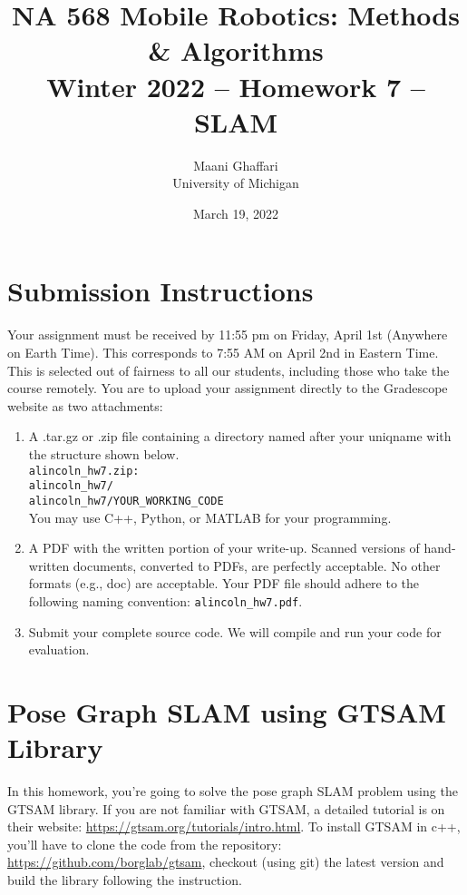 \documentclass{article}
\title{NA 568 Mobile Robotics: Methods \& Algorithms \\ Winter 2022 -- Homework 7 -- SLAM}
\author{Maani Ghaffari \\ University of Michigan}
\date{March 19, 2022}
\begin{document}
\maketitle

\section*{Submission Instructions}
Your assignment must be received by 11:55 pm on Friday, April 1st (Anywhere on Earth Time). This corresponds to 7:55 AM on April 2nd in Eastern Time. This is selected out of fairness to all our students, including those who take the course remotely. You are to upload your assignment directly to the Gradescope website as two attachments:

\begin{enumerate}
    \item A .tar.gz or .zip file containing a directory named after your uniqname with the structure shown below. \\
    \texttt{alincoln\_hw7.zip:} \\
    \texttt{alincoln\_hw7/} \\
    \texttt{alincoln\_hw7/YOUR\_WORKING\_CODE} \\
    You may use C++, Python, or MATLAB for your programming.

    \item A PDF with the written portion of your write-up. Scanned versions of hand-written documents, converted to PDFs, are perfectly acceptable. No other formats (e.g., doc) are acceptable. Your PDF file should adhere to the following naming convention: \texttt{alincoln\_hw7.pdf}.

    \item Submit your complete source code. We will compile and run your code for evaluation.
\end{enumerate}

\section{Pose Graph SLAM using GTSAM Library}
In this homework, you’re going to solve the pose graph SLAM problem using the GTSAM library. If you are not familiar with GTSAM, a detailed tutorial is on their website: \url{https://gtsam.org/tutorials/intro.html}. To install GTSAM in c++, you’ll have to clone the code from the repository: \url{https://github.com/borglab/gtsam}, checkout (using git) the latest version and build the library following the instruction.
\end{document}
